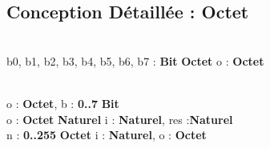 \subsection{Conception Détaillée : Octet}

\begin{algorithme}
    \\
    {b0, b1, b2, b3, b4, b5, b6, b7 : \textbf{Bit}}
    {\textbf{Octet}}
    {}
    {o : \textbf{Octet}}
    {  		
        
    }
    \\
    {o : \textbf{Octet}, b : \textbf{0..7}}
    {\textbf{Bit}}
    {}
    {}
    {
    }
 	\\
    {o : \textbf{Octet}}
    {\textbf{Naturel}}
    {}
    {i : \textbf{Naturel}, res :\textbf{Naturel} }
	{   
    {
    }
    }  
    \\
    {n : \textbf{0..255}}
    {\textbf{Octet}}
    {}{i : \textbf{Naturel}, o : \textbf{Octet}}
    { 
		{
      }
    }
\end{algorithme}
